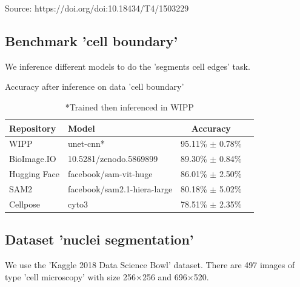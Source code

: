 \medskip

Source: https://doi.org/doi:10.18434/T4/1503229

\subsection{Benchmark 'cell boundary'}

We inference different models to do the 'segments cell edges' task.

\begin{table}[H]
  \footnotesize
  \centering
  \caption{Accuracy after inference on data 'cell boundary'}
  \begin{tabular}{llcc}
    \toprule
    Repository    & Model                       & Accuracy             \\ [0.5ex]
    \midrule
    WIPP          & unet-cnn*                   & 95.11\% $\pm$ 0.78\% \\
    BioImage.IO   & 10.5281/zenodo.5869899      & 89.30\% $\pm$ 0.84\% \\
    Hugging Face  & facebook/sam-vit-huge       & 86.01\% $\pm$ 2.50\% \\
    SAM2          & facebook/sam2.1-hiera-large & 80.18\% $\pm$ 5.02\% \\
    Cellpose      & cyto3                       & 78.51\% $\pm$ 2.35\% \\
    \bottomrule
  \end{tabular}
  \caption*{*Trained then inferenced in WIPP}
\end{table}

\subsection{Dataset 'nuclei segmentation'}

We use the 'Kaggle 2018 Data Science Bowl' dataset. There are 497 images of type
'cell microscopy' with size 256$\times$256 and 696$\times$520.

\medskip

